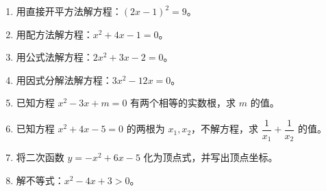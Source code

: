 \documentclass[12pt, a4paper]{ctexart}
\begin{document}
\begin{enumerate}[leftmargin=2em]
  \item 用直接开平方法解方程：$(2x - 1)^2 = 9$。

  \item 用配方法解方程：$x^2 + 4x - 1 = 0$。

  \item 用公式法解方程：$2x^2 + 3x - 2 = 0$。

  \item 用因式分解法解方程：$3x^2 - 12x = 0$。

  \item 已知方程 $x^2 - 3x + m = 0$ 有两个相等的实数根，求 $m$ 的值。

  \item 已知方程 $x^2 + 4x - 5 = 0$ 的两根为 $x_1, x_2$，不解方程，求 $\dfrac{1}{x_1} + \dfrac{1}{x_2}$ 的值。

  \item 将二次函数 $y = -x^2 + 6x - 5$ 化为顶点式，并写出顶点坐标。

  \item 解不等式：$x^2 - 4x + 3 > 0$。
\end{enumerate}

\vspace{20pt}
\end{document}
